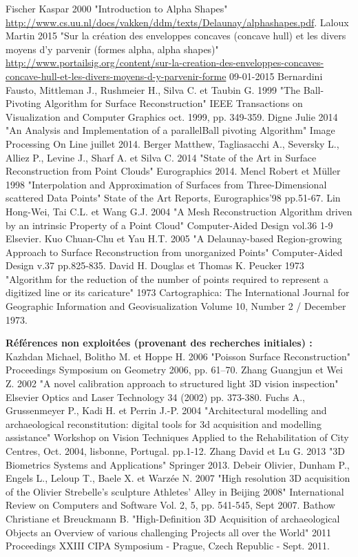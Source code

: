 \documentclass[a4paper,10pt]{report}
\begin{document}
\begin{thebibliography}{1}
 Fischer Kaspar 2000 "Introduction to Alpha Shapes" \url{http://www.cs.uu.nl/docs/vakken/ddm/texts/Delaunay/alphashapes.pdf}.
 Laloux Martin 2015 "Sur la création des enveloppes concaves (concave hull) et les divers moyens d'y parvenir (formes alpha, alpha shapes)" \url{http://www.portailsig.org/content/sur-la-creation-des-enveloppes-concaves-concave-hull-et-les-divers-moyens-d-y-parvenir-forme} 09-01-2015
 Bernardini Fausto, Mittleman J., Rushmeier H., Silva C. et Taubin G. 1999 "The Ball-Pivoting Algorithm for Surface Reconstruction" IEEE Transactions on Visualization and Computer Graphics oct. 1999, pp. 349-359.
 Digne Julie 2014 "An Analysis and Implementation of a parallelBall pivoting Algorithm" Image Processing On Line juillet 2014.
 Berger Matthew, Tagliasacchi A., Seversky L., Alliez P., Levine J., Sharf A. et Silva C. 2014 "State of the Art in Surface Reconstruction from Point Clouds" Eurographics 2014.
 Mencl Robert et M{\"u}ller 1998 "Interpolation and Approximation of Surfaces from Three-Dimensional scattered Data Points" State of the Art Reports, Eurographics'98 pp.51-67.
 Lin Hong-Wei, Tai C.L. et Wang G.J. 2004 "A Mesh Reconstruction Algorithm driven by an intrinsic Property of a Point Cloud" Computer-Aided Design vol.36 1-9 Elsevier.
 Kuo Chuan-Chu et Yau H.T. 2005 "A Delaunay-based Region-growing Approach to Surface Reconstruction from unorganized Points" Computer-Aided Design v.37 pp.825-835.
 David H. Douglas et Thomas K. Peucker 1973 "Algorithm for the reduction of the number of points required to represent a digitized line or its caricature" 1973 Cartographica: The International Journal for Geographic Information and Geovisualization Volume 10, Number 2 / December 1973.

\textbf{Références non exploitées (provenant des recherches initiales) :}
 Kazhdan Michael, Bolitho M. et Hoppe H. 2006 "Poisson Surface Reconstruction" Proceedings Symposium on Geometry 2006, pp. 61–70.
 Zhang Guangjun et Wei Z. 2002 "A novel calibration approach to structured light 3D vision inspection" Elsevier Optics and Laser Technology 34 (2002) pp. 373-380.
 Fuchs A., Grussenmeyer P., Kadi H. et Perrin J.-P. 2004 "Architectural modelling and archaeological reconstitution: digital tools for 3d acquisition and modelling assistance" Workshop on Vision Techniques Applied to the Rehabilitation of City Centres, Oct. 2004, lisbonne, Portugal. pp.1-12.
 Zhang David et Lu G. 2013 "3D Biometrics Systems and Applications" Springer 2013.
 Debeir Olivier, Dunham P., Engels L., Leloup T., Baele X. et Warzée N. 2007 "High resolution 3D acquisition of the Olivier Strebelle's sculpture Athletes' Alley in Beijing 2008" International Review on Computers and Software Vol. 2, 5, pp. 541-545, Sept 2007.
 Bathow Christiane et Breuckmann B. "High-Definition 3D Acquisition of archaeological Objects an Overview of various challenging Projects all over the World" 2011 Proceedings XXIII CIPA Symposium - Prague, Czech Republic - Sept. 2011.

\end{thebibliography}
\end{document}
